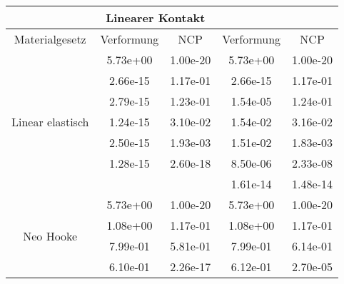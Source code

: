 \begin{table} 
\centering 
\begin{tabular}{c|cc|cc|} 
\cline{2-5} 
 & \multicolumn{2}{|c|}{Linearer Kontakt} &  \\ 
\hline 
\multicolumn{1}{|c|}{Materialgesetz} & \multicolumn{1}{c|}{Verformung} & \multicolumn{1}{c|}{NCP} & \multicolumn{1}{c|}{Verformung} & \multicolumn{1}{c|}{NCP} \\ 
\hline 
\multicolumn{1}{|c|}{\multirow{7}{*}{Linear elastisch}} &\multicolumn{1}{|c|}{  5.73e+00} & \multicolumn{1}{|c|}{  1.00e-20} & \multicolumn{1}{|c|}{  5.73e+00} & \multicolumn{1}{|c|}{  1.00e-20} \\ 
\multicolumn{1}{|c|}{} & \multicolumn{1}{|c|}{  2.66e-15} & \multicolumn{1}{|c|}{  1.17e-01} & \multicolumn{1}{|c|}{  2.66e-15} & \multicolumn{1}{|c|}{  1.17e-01} \\ 
\multicolumn{1}{|c|}{} & \multicolumn{1}{|c|}{  2.79e-15} & \multicolumn{1}{|c|}{  1.23e-01} & \multicolumn{1}{|c|}{  1.54e-05} & \multicolumn{1}{|c|}{  1.24e-01} \\ 
\multicolumn{1}{|c|}{} & \multicolumn{1}{|c|}{  1.24e-15} & \multicolumn{1}{|c|}{  3.10e-02} & \multicolumn{1}{|c|}{  1.54e-02} & \multicolumn{1}{|c|}{  3.16e-02} \\ 
\multicolumn{1}{|c|}{} & \multicolumn{1}{|c|}{  2.50e-15} & \multicolumn{1}{|c|}{  1.93e-03} & \multicolumn{1}{|c|}{  1.51e-02} & \multicolumn{1}{|c|}{  1.83e-03} \\ 
\multicolumn{1}{|c|}{} & \multicolumn{1}{|c|}{  1.28e-15} & \multicolumn{1}{|c|}{  2.60e-18} & \multicolumn{1}{|c|}{  8.50e-06} & \multicolumn{1}{|c|}{  2.33e-08} \\ 
\multicolumn{1}{|c|}{} & \multicolumn{1}{|c|}{} & \multicolumn{1}{|c|}{} & \multicolumn{1}{|c|}{  1.61e-14} & \multicolumn{1}{|c|}{  1.48e-14} \\ 
\hline 
\multicolumn{1}{|c|}{\multirow{7}{*}{Neo Hooke}} &\multicolumn{1}{|c|}{  5.73e+00} & \multicolumn{1}{|c|}{  1.00e-20} & \multicolumn{1}{|c|}{  5.73e+00} & \multicolumn{1}{|c|}{  1.00e-20} \\ 
\multicolumn{1}{|c|}{} & \multicolumn{1}{|c|}{  1.08e+00} & \multicolumn{1}{|c|}{  1.17e-01} & \multicolumn{1}{|c|}{  1.08e+00} & \multicolumn{1}{|c|}{  1.17e-01} \\ 
\multicolumn{1}{|c|}{} & \multicolumn{1}{|c|}{  7.99e-01} & \multicolumn{1}{|c|}{  5.81e-01} & \multicolumn{1}{|c|}{  7.99e-01} & \multicolumn{1}{|c|}{  6.14e-01} \\ 
\multicolumn{1}{|c|}{} & \multicolumn{1}{|c|}{  6.10e-01} & \multicolumn{1}{|c|}{  2.26e-17} & \multicolumn{1}{|c|}{  6.12e-01} & \multicolumn{1}{|c|}{  2.70e-05} \\ 

\end{tabular}
\end{table}

